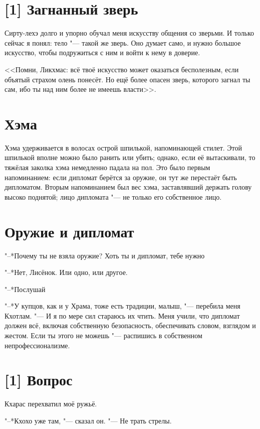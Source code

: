 \section{[1] Загнанный зверь}

Сирту-лехэ долго и упорно обучал меня искусству общения со зверьми.
И только сейчас я понял: тело "--- такой же зверь.
Оно думает само, и нужно большое искусство, чтобы подружиться с ним и войти к нему в доверие.

<<Помни, Ликхмас: всё твоё искусство может оказаться бесполезным, если объятый страхом олень понесёт.
Но ещё более опасен зверь, которого загнал ты сам, ибо ты над ним более не имеешь власти>>.

\section{Хэма}

Хэма удерживается в волосах острой шпилькой, напоминающей стилет.
Этой шпилькой вполне можно было ранить или убить;
однако, если её вытаскивали, то тяжёлая заколка хэма немедленно падала на пол.
Это было первым напоминанием: если дипломат берётся за оружие, он тут же перестаёт быть дипломатом.
Вторым напоминанием был вес хэма, заставлявший держать голову высоко поднятой;
лицо дипломата "--- не только его собственное лицо.

\section{Оружие и дипломат}

"--*Почему ты не взяла оружие?
Хоть ты и дипломат, тебе нужно\ldotst

"--*Нет, Лисёнок.
Или одно, или другое.

"--*Послушай\ldotst

"--*У купцов, как и у Храма, тоже есть традиции, малыш, "--- перебила меня Кхотлам.
"--- И я по мере сил стараюсь их чтить.
Меня учили, что дипломат должен всё, включая собственную безопасность, обеспечивать словом, взглядом и жестом.
Если ты этого не можешь "--- распишись в собственном непрофессионализме.

\section{[1] Вопрос}

Кхарас перехватил моё ружьё.

"--*Кхохо уже там, "--- сказал он.
"--- Не трать стрелы.

